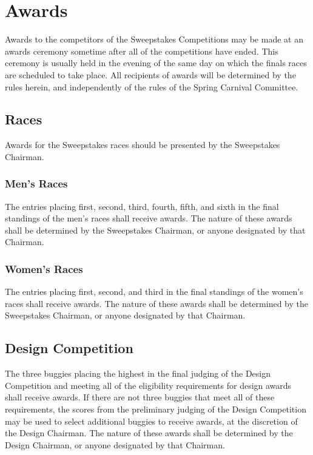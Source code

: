 \chapter{Awards}

Awards to the competitors of the Sweepstakes Competitions may be made at an awards ceremony sometime after all of the competitions have ended. This ceremony is usually held in the evening of the same day on which the finals races are scheduled to take place. All recipients of awards will be determined by the rules herein, and independently of the rules of the Spring Carnival Committee.

\section{Races}

Awards for the Sweepstakes races should be presented by the Sweepstakes Chairman.

\subsection{Men's Races}

The entries placing first, second, third, fourth, fifth, and sixth in the final standings of the men's races shall receive awards. The nature of these awards shall be determined by the Sweepstakes Chairman, or anyone designated by that Chairman.

\subsection{Women's Races}

The entries placing first, second, and third in the final standings of the women's races shall receive awards. The nature of these awards shall be determined by the Sweepstakes Chairman, or anyone designated by that Chairman.

\section{Design Competition}

The three buggies placing the highest in the final judging of the Design Competition and meeting all of the eligibility requirements for design awards shall receive awards. If there are not three buggies that meet all of these requirements, the scores from the preliminary judging of the Design Competition may be used to select additional buggies to receive awards, at the discretion of the Design Chairman. The nature of these awards shall be determined by the Design Chairman, or anyone designated by that Chairman.

